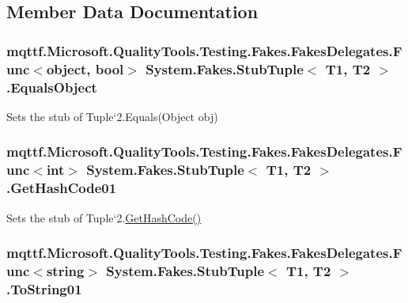 \subsection{Member Data Documentation}
\hypertarget{class_system_1_1_fakes_1_1_stub_tuple_3_01_t1_00_01_t2_01_4_a67665131bcc0c553da0de01016924f31}{
\subsubsection[{Equals\-Object}]{\setlength{\rightskip}{0pt plus 5cm}mqttf.\-Microsoft.\-Quality\-Tools.\-Testing.\-Fakes.\-Fakes\-Delegates.\-Func$<$object, bool$>$ System.\-Fakes.\-Stub\-Tuple$<$ T1, T2 $>$.Equals\-Object}}\label{class_system_1_1_fakes_1_1_stub_tuple_3_01_t1_00_01_t2_01_4_a67665131bcc0c553da0de01016924f31}


Sets the stub of Tuple`2.Equals(\-Object obj)

\hypertarget{class_system_1_1_fakes_1_1_stub_tuple_3_01_t1_00_01_t2_01_4_a246fcac2f6d0ea91eb23f1d3da3e35f6}{
\subsubsection[{Get\-Hash\-Code01}]{\setlength{\rightskip}{0pt plus 5cm}mqttf.\-Microsoft.\-Quality\-Tools.\-Testing.\-Fakes.\-Fakes\-Delegates.\-Func$<$int$>$ System.\-Fakes.\-Stub\-Tuple$<$ T1, T2 $>$.Get\-Hash\-Code01}}\label{class_system_1_1_fakes_1_1_stub_tuple_3_01_t1_00_01_t2_01_4_a246fcac2f6d0ea91eb23f1d3da3e35f6}


Sets the stub of Tuple`2.\hyperlink{class_system_1_1_fakes_1_1_stub_tuple_3_01_t1_00_01_t2_01_4_ac97951511d2e14d82747dca526c23211}{Get\-Hash\-Code()}

\hypertarget{class_system_1_1_fakes_1_1_stub_tuple_3_01_t1_00_01_t2_01_4_a77ba27ccc4d91a7d9173902b1df72eb3}{
\subsubsection[{To\-String01}]{\setlength{\rightskip}{0pt plus 5cm}mqttf.\-Microsoft.\-Quality\-Tools.\-Testing.\-Fakes.\-Fakes\-Delegates.\-Func$<$string$>$ System.\-Fakes.\-Stub\-Tuple$<$ T1, T2 $>$.To\-String01}}\label{class_system_1_1_fakes_1_1_stub_tuple_3_01_t1_00_01_t2_01_4_a77ba27ccc4d91a7d9173902b1df72eb3}


